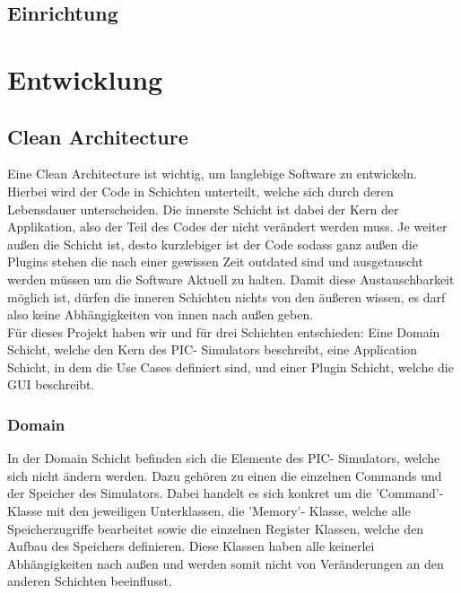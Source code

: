 \documentclass[12pt,a4paper,titlepage,ngerman,pdftex]{report}
\begin{document}
    
    

    \section{Einrichtung}\label{sec:einrichtung}

    \chapter{Entwicklung}\label{ch:entwicklung}
    \section{Clean Architecture}\label{sec:cleanarchitecture}

    Eine Clean Architecture ist wichtig, um langlebige Software zu entwickeln. Hierbei wird der Code in Schichten unterteilt, welche sich durch deren Lebensdauer unterscheiden. Die innerste Schicht ist dabei der Kern der Applikation, also der Teil des Codes der nicht verändert werden muss.
    Je weiter außen die Schicht ist, desto kurzlebiger ist der Code sodass ganz außen die Plugins stehen die nach einer gewissen Zeit outdated sind und ausgetauscht werden müssen um die Software Aktuell zu halten. 
    Damit diese Austauschbarkeit möglich ist, dürfen die inneren Schichten nichts von den äußeren wissen, es darf also keine Abhängigkeiten von innen nach außen geben.
    \\

    Für dieses Projekt haben wir und für drei Schichten entschieden: Eine Domain Schicht, welche den Kern des PIC- Simulators beschreibt, eine Application Schicht, in dem die Use Cases definiert sind, und einer Plugin Schicht, welche die GUI beschreibt.

    \subsection{Domain}
    In der Domain Schicht befinden sich die Elemente des PIC- Simulators, welche sich nicht ändern werden. Dazu gehören zu einen die einzelnen Commands und der Speicher des Simulators. Dabei handelt es sich konkret um die 'Command'- Klasse mit den jeweiligen Unterklassen, die 'Memory'- Klasse, 
    welche alle Speicherzugriffe bearbeitet sowie die einzelnen Register Klassen, welche den Aufbau des Speichers definieren. Diese Klassen haben alle keinerlei Abhängigkeiten nach außen und werden somit nicht von Veränderungen an den anderen Schichten beeinflusst.
\end{document}
